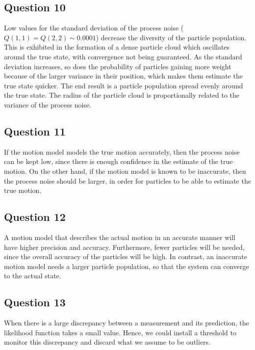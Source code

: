 \subsection{Question 10}

Low values for the standard deviation of the process noise ($Q(1,1) = Q(2,2) \sim 0.0001$) decrease the diversity of the particle population. This is exhibited
in the formation of a dense particle cloud which oscillates around the true state, with convergence not being guaranteed. As the standard deviation increases,
so does the probability of particles gaining more weight because of the larger variance in their position, which makes them estimate the true state quicker. The end
result is a particle population spread evenly around the true state. The radius of the particle cloud is proportionally related to the variance of the process noise.

\subsection{Question 11}

If the motion model models the true motion accurately, then the process noise can be kept low, since there is enough confidence in the estimate of the true motion.
On the other hand, if the motion model is known to be inaccurate, then the process noise should be larger, in order for particles to be able to estimate the
true motion.

\subsection{Question 12}

A motion model that describes the actual motion in an accurate manner will have higher precision and accuracy. Furthermore, fewer particles will be needed, since
the overall accuracy of the particles will be high. In contrast, an inaccurate motion model needs a larger particle population, so that the system can converge to 
the actual state.

\subsection{Question 13}

When there is a large discrepancy between a measurement and its prediction, the likelihood function takes a small value. Hence, we could install a threshold
to monitor this discrepancy and discard what we assume to be outliers.

